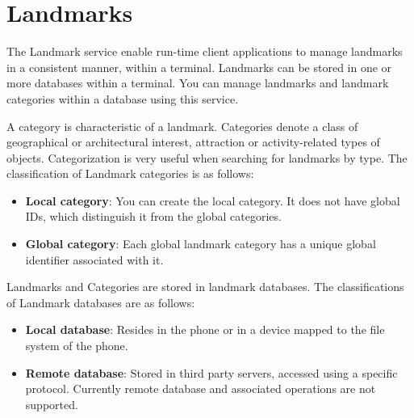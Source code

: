 %
%
%

\section{Landmarks}
\label{sec:scriptextlandmarks}

The Landmark service enable run-time client applications to manage landmarks in a consistent manner, within a terminal. Landmarks can be stored in one or more databases within a terminal. You can manage landmarks and landmark categories within a database using this service.

A category is characteristic of a landmark. Categories denote a class of geographical or architectural interest, attraction or activity-related types of objects. Categorization is very useful when searching for landmarks by type. The classification of Landmark categories is as follows:

\begin{itemize}
\item {\bf Local category}: You can create the local category. It does not have global IDs, which distinguish it from the global categories.
\item {\bf Global category}: Each global landmark category has a unique global identifier associated with it.
\end{itemize}

Landmarks and Categories are stored in landmark databases. The classifications of Landmark databases are as follows:

\begin{itemize}
\item {\bf Local database}: Resides in the phone or in a device mapped to the file system of the phone.
\item {\bf Remote database}: Stored in third party servers, accessed using a specific protocol. Currently remote database and associated operations are not supported.
\end{itemize}

